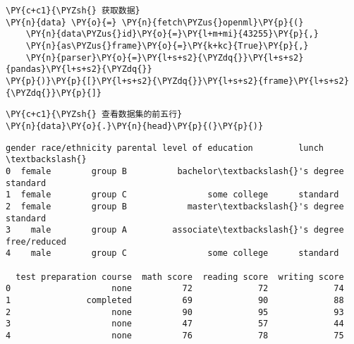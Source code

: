     \begin{tcolorbox}[breakable, size=fbox, boxrule=1pt, pad at break*=1mm,colback=cellbackground, colframe=cellborder]
\begin{Verbatim}[commandchars=\\\{\}]
\PY{c+c1}{\PYZsh{} 获取数据}
\PY{n}{data} \PY{o}{=} \PY{n}{fetch\PYZus{}openml}\PY{p}{(}
    \PY{n}{data\PYZus{}id}\PY{o}{=}\PY{l+m+mi}{43255}\PY{p}{,}
    \PY{n}{as\PYZus{}frame}\PY{o}{=}\PY{k+kc}{True}\PY{p}{,}
    \PY{n}{parser}\PY{o}{=}\PY{l+s+s2}{\PYZdq{}}\PY{l+s+s2}{pandas}\PY{l+s+s2}{\PYZdq{}}
\PY{p}{)}\PY{p}{[}\PY{l+s+s2}{\PYZdq{}}\PY{l+s+s2}{frame}\PY{l+s+s2}{\PYZdq{}}\PY{p}{]}
\end{Verbatim}
\end{tcolorbox}

    \begin{tcolorbox}[breakable, size=fbox, boxrule=1pt, pad at break*=1mm,colback=cellbackground, colframe=cellborder]
\begin{Verbatim}[commandchars=\\\{\}]
\PY{c+c1}{\PYZsh{} 查看数据集的前五行}
\PY{n}{data}\PY{o}{.}\PY{n}{head}\PY{p}{(}\PY{p}{)}
\end{Verbatim}
\end{tcolorbox}

            \begin{tcolorbox}[breakable, size=fbox, boxrule=.5pt, pad at break*=1mm, opacityfill=0]
\begin{Verbatim}[commandchars=\\\{\}]
   gender race/ethnicity parental level of education         lunch  \textbackslash{}
0  female        group B          bachelor\textbackslash{}'s degree      standard
1  female        group C                some college      standard
2  female        group B            master\textbackslash{}'s degree      standard
3    male        group A         associate\textbackslash{}'s degree  free/reduced
4    male        group C                some college      standard

  test preparation course  math score  reading score  writing score
0                    none          72             72             74
1               completed          69             90             88
2                    none          90             95             93
3                    none          47             57             44
4                    none          76             78             75
\end{Verbatim}
\end{tcolorbox}
        
